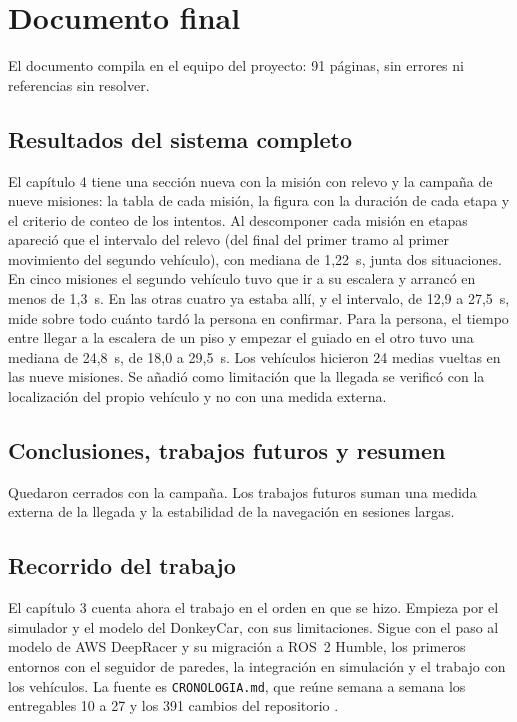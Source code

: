 \documentclass[12pt,letterpaper]{article}
\begin{document}
\section{Documento final}
\label{sec:documento}

El documento compila en el equipo del proyecto: 91 páginas, sin errores ni referencias sin resolver.

\subsection{Resultados del sistema completo}

El capítulo 4 tiene una sección nueva con la misión con relevo y la campaña de nueve misiones: la tabla de cada misión, la figura con la duración de cada etapa y el criterio de conteo de los intentos. Al descomponer cada misión en etapas apareció que el intervalo del relevo (del final del primer tramo al primer movimiento del segundo vehículo), con mediana de 1,22~s, junta dos situaciones. En cinco misiones el segundo vehículo tuvo que ir a su escalera y arrancó en menos de 1,3~s. En las otras cuatro ya estaba allí, y el intervalo, de 12,9 a 27,5~s, mide sobre todo cuánto tardó la persona en confirmar. Para la persona, el tiempo entre llegar a la escalera de un piso y empezar el guiado en el otro tuvo una mediana de 24,8~s, de 18,0 a 29,5~s. Los vehículos hicieron 24 medias vueltas en las nueve misiones. Se añadió como limitación que la llegada se verificó con la localización del propio vehículo y no con una medida externa.

\subsection{Conclusiones, trabajos futuros y resumen}

Quedaron cerrados con la campaña. Los trabajos futuros suman una medida externa de la llegada y la estabilidad de la navegación en sesiones largas.

\subsection{Recorrido del trabajo}

El capítulo 3 cuenta ahora el trabajo en el orden en que se hizo. Empieza por el simulador y el modelo del DonkeyCar, con sus limitaciones. Sigue con el paso al modelo de AWS DeepRacer y su migración a ROS~2 Humble, los primeros entornos con el seguidor de paredes, la integración en simulación y el trabajo con los vehículos. La fuente es \texttt{CRONOLOGIA.md}, que reúne semana a semana los entregables 10 a 27 y los 391 cambios del repositorio \cite{cronologia}.
\end{document}
